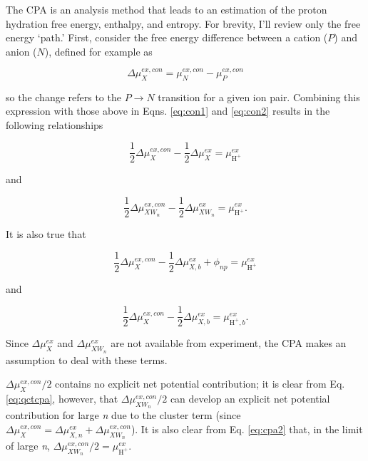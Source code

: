 \begin{cpa}
  The CPA is an analysis method that leads to an estimation of the proton hydration free energy, enthalpy, and entropy. For brevity, I'll review
  only the free energy `path.' First, consider the free energy difference between a cation ($P$) and anion ($N$), defined for example as
  
  \begin{equation}
    \Delta \mu_X^{ex,con} =  \mu^{ex,con}_{N} - \mu^{ex,con}_{P}  
    \label{eq:cpadiff}
  \end{equation}

  \noindent so the change refers to the $P \rightarrow N$ transition for a given ion pair. Combining this expression with those above in Eqns.
  \ref{eq:con1} and \ref{eq:con2} results in the following relationships

  \begin{equation}
    \frac{1}{2} \Delta \mu_{X}^{ex,con} - \frac{1}{2} \Delta \mu_{X}^{ex} = \mu^{ex}_{\mathrm{H}^+}
    \label{eq:cpa1}
  \end{equation}

  \noindent and
  
  \begin{equation}
    \frac{1}{2} \Delta \mu_{XW_n}^{ex,con} -  \frac{1}{2} \Delta \mu_{XW_n}^{ex} = \mu^{ex}_{\mathrm{H}^+}.
    \label{eq:cpa2}
  \end{equation}

  \noindent It is also true that 
  
  \begin{equation}
    \frac{1}{2} \Delta \mu_{X}^{ex,con} - \frac{1}{2} \Delta \mu_{X,b}^{ex} + \phi_{np} = \mu^{ex}_{\mathrm{H}^+}
    \label{eq:cpa1bulk-1}
  \end{equation}
  
  \noindent and 

  \begin{equation}
    \frac{1}{2} \Delta \mu_{X}^{ex,con} - \frac{1}{2} \Delta \mu_{X,b}^{ex} = \mu^{ex}_{\mathrm{H}^+,b}.
    \label{eq:cpa1bulk}
  \end{equation}

  \noindent Since $\Delta \mu_{X}^{ex}$ and $\Delta \mu_{XW_n}^{ex}$ are not available from experiment, the CPA makes an assumption to deal with 
  these terms. 

  $\Delta \mu_{X}^{ex,con}/2$ contains no explicit net potential contribution; it is clear from Eq. \ref{eq:qctcpa}, however, that $\Delta 
  \mu_{XW_n}^{ex,con}/2$ can develop an explicit net potential contribution for large \emph{n} due to the cluster term (since $\Delta 
  \mu^{ex,con}_{X} = \Delta \mu^{ex}_{X,n} + \Delta\mu^{ex,con}_{XW_n}$). It is also clear from Eq. \ref{eq:cpa2} that, in the limit of large 
  \emph{n}, $\Delta \mu_{XW_n}^{ex,con}/2 = \mu^{ex}_{\mathrm{H}^+}$.


\end{cpa}
